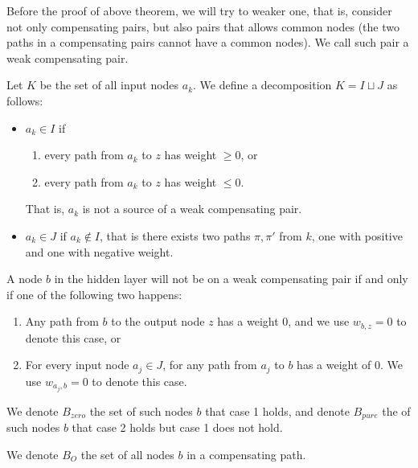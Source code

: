 				
				Before the proof of above theorem, we will try to weaker one, that is, consider not only compensating pairs, but also pairs that allows common nodes (the two paths in a compensating pairs cannot have a common nodes). We call such pair a weak compensating pair.
				
				
				\begin{definition}
					Let $K$ be the set of  all input nodes $a_k$. 
					We define a decomposition $K=I\sqcup J$ as follows:  
					\begin{itemize}
						\item $a_k \in I$  if
						\begin{enumerate}
							\item every path from $a_k$ to $z$ has weight $\geq 0$, or
							\item every path from $a_k$ to $z$ has weight $\leq 0$.
						\end{enumerate}
						That is, $a_k$ is not a source of a weak compensating pair.
						\item $a_k \in J$ if $a_k \notin I$, that is there exists two paths $\pi,\pi'$ from $k$, 
						one with positive and one with negative weight.
					\end{itemize}
				\end{definition} 
				
				
				
				\begin{lemma} \label{lem:open_node_2}
					A node $b$ in the hidden layer will not be on a weak compensating pair if and only if one of the following two happens:
					\begin{enumerate}
						\item Any path from $b$ to the output node $z$ has a weight $0$, and we use $w_{b,z}=0$ to denote this case, or
						\item For every input node $a_j\in J$, for any path from $a_j$ to $b$ has a weight of $0$. We use $w_{a_j,b}=0$ to denote this case.
					\end{enumerate}
					We denote $B_{zero}$ the set of such nodes $b$ that case 1 holds, and denote $B_{pure}$ the of such nodes $b$ that case 2 holds but case 1 does not hold.
					
					We denote $B_O$ the set of all nodes $b$ in a compensating path.
				\end{lemma}
				
